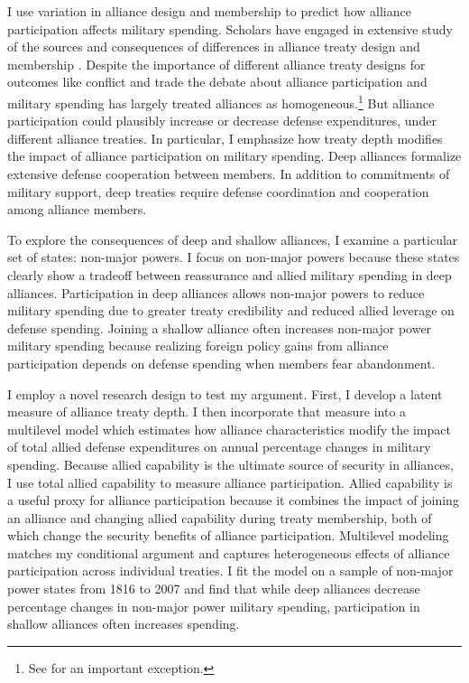 \documentclass[12pt]{article}
\begin{document}
I use variation in alliance design and membership to predict how alliance participation affects military spending. 
Scholars have engaged in extensive study of the sources and consequences of differences in alliance treaty design and membership \citep{Mattes2012, Benson2012, Poast2019a, Morrow1991, Leeds2003, LeedsAnac2005, Fordham2010, Mattes2012,  Poast2013, Johnsonetal2015}. 
Despite the importance of different alliance treaty designs for outcomes like conflict \citep{Leeds2003, Benson2012} and trade \citep{Long2003, LongLeeds2006} the debate about alliance participation and military spending has largely treated alliances as homogeneous.\footnote{See \citet{DigiuseppePoast2016} for an important exception.}
But alliance participation could plausibly increase or decrease defense expenditures, under different alliance treaties. 
In particular, I emphasize how treaty depth modifies the impact of alliance participation on military spending. 
Deep alliances formalize extensive defense cooperation between members. 
In addition to commitments of military support, deep treaties require defense coordination and cooperation among alliance members. 


To explore the consequences of deep and shallow alliances, I examine a particular set of states: non-major powers. 
I focus on non-major powers because these states clearly show a tradeoff between reassurance and allied military spending in deep alliances.
Participation in deep alliances allows non-major powers to reduce military spending due to greater treaty credibility and reduced allied leverage on defense spending. 
Joining a shallow alliance often increases non-major power military spending because realizing foreign policy gains from alliance participation depends on defense spending when members fear abandonment.

 
I employ a novel research design to test my argument.
First, I develop a latent measure of alliance treaty depth. 
I then incorporate that measure into a multilevel model which estimates how alliance characteristics modify the impact of total allied defense expenditures on annual percentage changes in military spending.
Because allied capability is the ultimate source of security in alliances, I use total allied capability to measure alliance participation.  
Allied capability is a useful proxy for alliance participation because it combines the impact of joining an alliance and changing allied capability during treaty membership, both of which change the security benefits of alliance participation. 
Multilevel modeling matches my conditional argument and captures heterogeneous effects of alliance participation across individual treaties. 
I fit the model on a sample of non-major power states from 1816 to 2007 and find that while deep alliances decrease percentage changes in non-major power military spending, participation in shallow alliances often increases spending.
\end{document}
